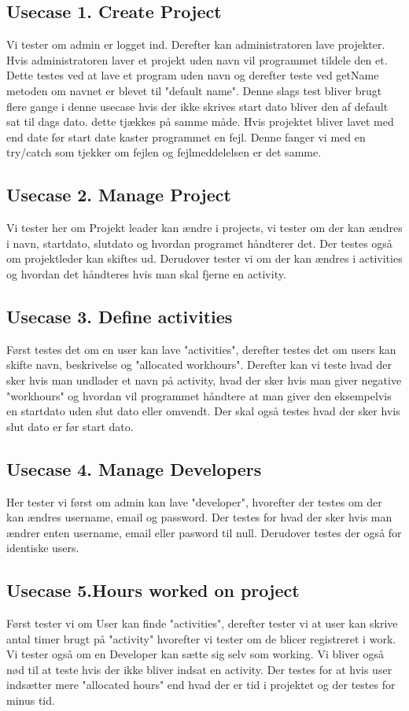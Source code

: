 \documentclass[a4paper,12pt]{article}
\begin{document}
\subsection*{Usecase 1. Create Project}
Vi tester om admin er logget ind. Derefter kan administratoren lave projekter. Hvis administratoren laver et projekt uden navn vil programmet tildele den et. Dette testes ved at lave et program uden navn og derefter teste ved getName metoden om navnet er blevet til "default name". Denne slags test bliver brugt flere gange i denne usecase hvis der ikke skrives start dato bliver den af default sat til dags dato. dette tjækkes på samme måde. Hvis projektet bliver lavet med end date før start date kaster programmet en fejl. Denne fanger vi med en try/catch som tjekker om fejlen og fejlmeddelelsen er det samme.

\subsection*{Usecase 2. Manage Project}
Vi tester her om Projekt leader kan ændre i projects, vi tester om der kan ændres i navn, startdato, slutdato og hvordan programet håndterer det. Der testes også om projektleder kan skiftes ud. Derudover tester vi om der kan ændres i activities og hvordan det håndteres hvis man skal fjerne en activity.

\subsection*{Usecase 3. Define activities}
Først testes det om en user kan lave "activities", derefter testes det om users kan skifte navn, beskrivelse og "allocated workhours". Derefter kan vi teste hvad der sker hvis man undlader et navn på activity, hvad der sker hvis man giver negative "workhours" og hvordan vil programmet håndtere at man giver den eksempelvis en startdato uden slut dato eller omvendt. Der skal også testes hvad der sker hvis slut dato er før start dato.

\subsection*{Usecase 4. Manage Developers}
Her tester vi først om admin kan lave "developer", hvorefter der testes om der kan ændres username, email og password. Der testes for hvad der sker hvis man ændrer enten username, email eller pasword til null. Derudover testes der også for identiske users.

\subsection*{Usecase 5.Hours worked on project}
Først tester vi om User kan finde "activities", derefter tester vi at user kan skrive antal timer brugt på "activity" hvorefter vi tester om de blicer registreret i work. Vi tester også om en Developer kan sætte sig selv som working. Vi bliver også nød til at teste hvis der ikke bliver indsat en activity. Der testes for at hvis user indsætter mere "allocated hours" end hvad der er tid i projektet og der testes for minus tid.
\end{document}
